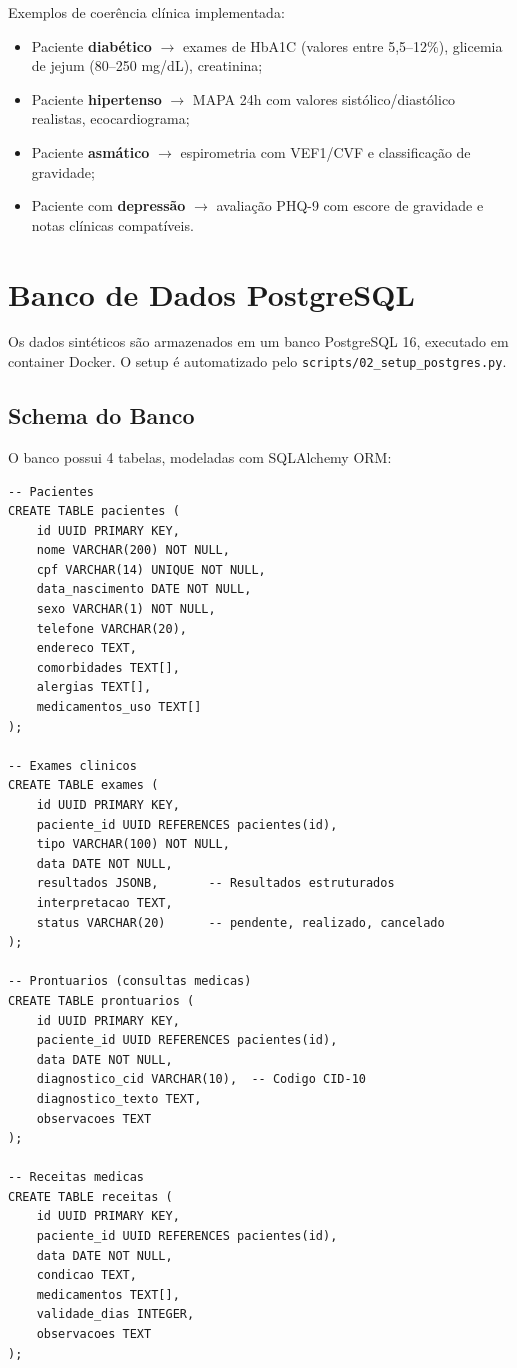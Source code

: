 Exemplos de coerência clínica implementada:
\begin{itemize}
    \item Paciente \textbf{diabético} $\rightarrow$ exames de HbA1C (valores entre 5,5--12\%), glicemia de jejum (80--250 mg/dL), creatinina;
    \item Paciente \textbf{hipertenso} $\rightarrow$ MAPA 24h com valores sistólico/diastólico realistas, ecocardiograma;
    \item Paciente \textbf{asmático} $\rightarrow$ espirometria com VEF1/CVF e classificação de gravidade;
    \item Paciente com \textbf{depressão} $\rightarrow$ avaliação PHQ-9 com escore de gravidade e notas clínicas compatíveis.
\end{itemize}

\section{Banco de Dados PostgreSQL}

Os dados sintéticos são armazenados em um banco PostgreSQL 16, executado em container Docker. O setup é automatizado pelo \texttt{scripts/02\_setup\_postgres.py}.

\subsection{Schema do Banco}

O banco possui 4 tabelas, modeladas com SQLAlchemy ORM:

\begin{lstlisting}[style=sql, caption={Schema do banco de dados.}]
-- Pacientes
CREATE TABLE pacientes (
    id UUID PRIMARY KEY,
    nome VARCHAR(200) NOT NULL,
    cpf VARCHAR(14) UNIQUE NOT NULL,
    data_nascimento DATE NOT NULL,
    sexo VARCHAR(1) NOT NULL,
    telefone VARCHAR(20),
    endereco TEXT,
    comorbidades TEXT[],
    alergias TEXT[],
    medicamentos_uso TEXT[]
);

-- Exames clinicos
CREATE TABLE exames (
    id UUID PRIMARY KEY,
    paciente_id UUID REFERENCES pacientes(id),
    tipo VARCHAR(100) NOT NULL,
    data DATE NOT NULL,
    resultados JSONB,       -- Resultados estruturados
    interpretacao TEXT,
    status VARCHAR(20)      -- pendente, realizado, cancelado
);

-- Prontuarios (consultas medicas)
CREATE TABLE prontuarios (
    id UUID PRIMARY KEY,
    paciente_id UUID REFERENCES pacientes(id),
    data DATE NOT NULL,
    diagnostico_cid VARCHAR(10),  -- Codigo CID-10
    diagnostico_texto TEXT,
    observacoes TEXT
);

-- Receitas medicas
CREATE TABLE receitas (
    id UUID PRIMARY KEY,
    paciente_id UUID REFERENCES pacientes(id),
    data DATE NOT NULL,
    condicao TEXT,
    medicamentos TEXT[],
    validade_dias INTEGER,
    observacoes TEXT
);
\end{lstlisting}

